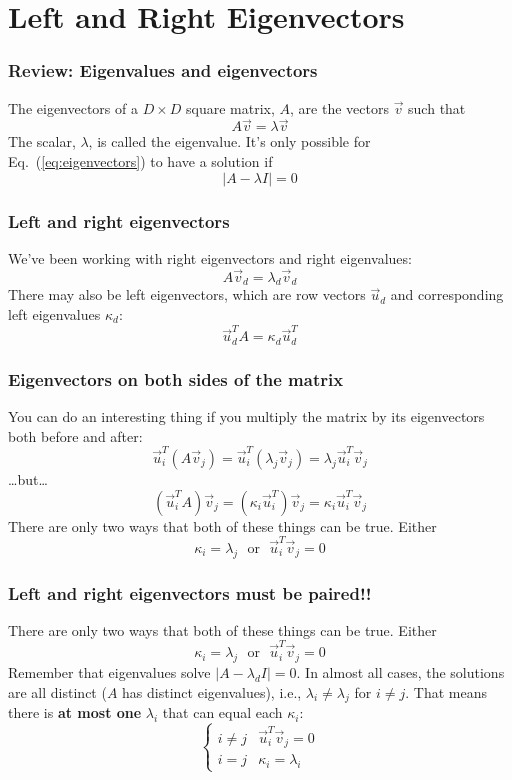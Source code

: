 \documentclass{beamer}
\begin{document}
\section[Eigenvectors]{Left and Right Eigenvectors}
\setcounter{subsection}{1}

\begin{frame}
  \frametitle{Review: Eigenvalues and eigenvectors}
  The eigenvectors of a $D\times D$ square matrix, $A$, are the
  vectors $\vec{v}$ such that
  \begin{equation}
    A\vec{v}=\lambda\vec{v}
    \label{eq:eigenvectors}
  \end{equation}
  The scalar, $\lambda$, is called the eigenvalue.  It's only possible
  for Eq.~(\ref{eq:eigenvectors}) to have a solution if
  \begin{equation}
    |A-\lambda I|=0
    \label{eq:eigenvalues}
  \end{equation}
\end{frame}

\begin{frame}
  \frametitle{Left and right eigenvectors}
  We’ve been working with right eigenvectors and right eigenvalues: 
  \[
  A\vec{v}_d =\lambda_d\vec{v}_d
  \]
  There may also be left eigenvectors, which are row vectors $\vec{u}_d$
  and corresponding left eigenvalues $\kappa_d$:
  \[
  \vec{u}_d^T A = \kappa_d\vec{u}_d^T
  \]
\end{frame}

\begin{frame}
  \frametitle{Eigenvectors on both sides of the matrix}
  You can do an interesting thing if you multiply the matrix by its eigenvectors both before and after:
  \[
  \vec{u}_i^T(A\vec{v}_j)=\vec{u}_i^T(\lambda_j\vec{v}_j)=\lambda_j\vec{u}_i^T\vec{v}_j
  \]
  \ldots but\ldots
  \[
  (\vec{u}_i^TA)\vec{v}_j=(\kappa_i\vec{u}_i^T)\vec{v}_j=\kappa_i\vec{u}_i^T\vec{v}_j
  \]
  There are only two ways that both of these things can be true. Either
  \[
  \kappa_i=\lambda_j~~~\mbox{or}~~~\vec{u}_i^T\vec{v}_j=0
  \]
\end{frame}

\begin{frame}
  \frametitle{Left and right eigenvectors must be paired!!}
  There are only two ways that both of these things can be true. Either
  \[
  \kappa_i=\lambda_j~~~\mbox{or}~~~\vec{u}_i^T\vec{v}_j=0
  \]
  Remember that eigenvalues solve $|A-\lambda_d I|=0$.  In almost all
  cases, the solutions are all distinct ($A$ has distinct
  eigenvalues), i.e., $\lambda_i\ne\lambda_j$ for $i\ne j$.  That
  means there is {\bf at most one} $\lambda_i$ that can equal each
  $\kappa_i$:
  \[
  \begin{cases}
    i\ne j & \vec{u}_i^T\vec{v}_j = 0\\
    i=j & \kappa_i = \lambda_i
  \end{cases}
  \]
\end{frame}
\end{document}
